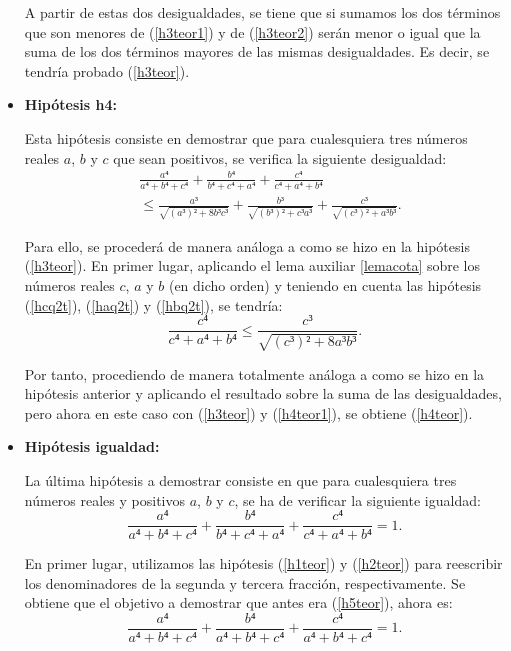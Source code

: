 \begin{demostracion}
\begin{itemize}
    A partir de estas dos desigualdades, se tiene que si sumamos los dos
    términos que son menores de (\ref{h3teor1}) y de (\ref{h3teor2})
    serán menor o igual que la suma de los dos términos mayores de las
    mismas desigualdades. Es decir, se tendría probado (\ref{h3teor}).

  \item \textbf{Hipótesis h4:}

    Esta hipótesis consiste en demostrar que para cualesquiera tres
    números reales \(a\), \(b\) y \(c\) que sean positivos, se verifica
    la siguiente desigualdad:
    \begin{align*}\label{h4teor}\tag{h4}
      & \frac{a⁴}{a⁴+b⁴+c⁴}+\frac{b⁴}{b⁴+c⁴+a⁴}+\frac{c⁴}{c⁴+a⁴+b⁴} \\
      & ≤ \frac{a³}{\sqrt{(a³)²+8b³c³}}+\frac{b³}{\sqrt{(b³)²+c³a³}}+
          \frac{c³}{\sqrt{(c³)²+a³b³}}.
    \end{align*}

    Para ello, se procederá de manera análoga a como se hizo en la
    hipótesis (\ref{h3teor}). En primer lugar, aplicando el lema
    auxiliar \ref{lemacota} sobre los números reales \(c\), \(a\) y
    \(b\) (en dicho orden) y teniendo en cuenta las hipótesis
    (\ref{hcq2t}), (\ref{haq2t}) y (\ref{hbq2t}), se tendría:
    \begin{equation}\label{h4teor1}
      \frac{c⁴}{c⁴+a⁴+b⁴} ≤ \frac{c³}{\sqrt{(c³)²+8a³b³}}.
    \end{equation}

    Por tanto, procediendo de manera totalmente análoga a como se hizo
    en la hipótesis anterior y aplicando el resultado sobre la suma de
    las desigualdades, pero ahora en este caso con (\ref{h3teor}) y
    (\ref{h4teor1}), se obtiene (\ref{h4teor}).

  \item \textbf{Hipótesis igualdad:}

    La última hipótesis a demostrar consiste en que para cualesquiera
    tres números reales y positivos \(a\), \(b\) y \(c\), se ha de
    verificar la siguiente igualdad:
    \begin{equation}\label{h5teor}\tag{igualdad}
      \frac{a⁴}{a⁴+b⁴+c⁴}+\frac{b⁴}{b⁴+c⁴+a⁴}+\frac{c⁴}{c⁴+a⁴+b⁴} = 1.
    \end{equation}

    En primer lugar, utilizamos las hipótesis (\ref{h1teor}) y
    (\ref{h2teor}) para reescribir los denominadores de la segunda y
    tercera fracción, respectivamente. Se obtiene que el objetivo a
    demostrar que antes era (\ref{h5teor}), ahora es:
    \begin{equation}\label{h5teor1}
      \frac{a⁴}{a⁴+b⁴+c⁴}+\frac{b⁴}{a⁴+b⁴+c⁴}+\frac{c⁴}{a⁴+b⁴+c⁴} = 1.
    \end{equation}


\end{itemize}
\end{demostracion}

